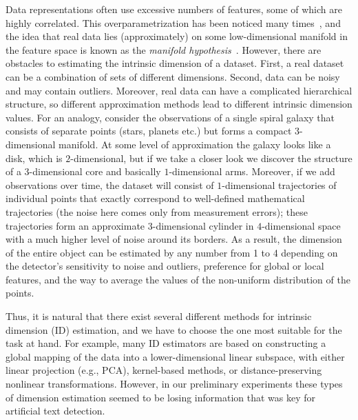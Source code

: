 \documentclass{article}
\begin{document}
Data representations often use excessive numbers of features, some of which are highly correlated. This overparametrization has been noticed many times~\citep{Hein-Audibert-2005, Kuleshov-et-al-2017, pope2021the}, and the idea that real data lies (approximately) on some low-dimensional manifold in the feature space is known as the \textit{manifold hypothesis}~\citep{Goodfellow-et-al-2016}.
However, there are obstacles to estimating the intrinsic dimension of a dataset. First, a real dataset can be a combination of sets of different dimensions.
Second, data can be noisy and may contain outliers. Moreover, real data can have a complicated hierarchical structure, so different approximation methods lead to different intrinsic dimension values. For an analogy, consider the observations of a single spiral galaxy that consists of separate points (stars, planets etc.) but forms a compact $3$-dimensional manifold. At some level of approximation the galaxy looks like a disk, which is $2$-dimensional, but if we take a closer look we discover the structure of a $3$-dimensional core and basically $1$-dimensional arms. Moreover, if we add observations over time, the dataset will consist of $1$-dimensional trajectories of individual points that exactly correspond to well-defined mathematical trajectories (the noise here comes only from measurement errors); these trajectories form an approximate $3$-dimensional cylinder in $4$-dimensional space with a much higher level of noise around its borders. As a result, the dimension of the entire object can be estimated by any number from 1 to 4 depending on the detector's sensitivity to noise and outliers, preference for global or local features, and the way to average the values of the non-uniform distribution of the points. 



Thus, it is natural that there exist several different methods for intrinsic dimension (ID) estimation, and we have to choose the one most suitable for the task at hand. For example, many ID estimators are based on constructing a global mapping of the data into a lower-dimensional linear subspace, with either linear projection (e.g., PCA), kernel-based methods, or distance-preserving nonlinear transformations. However, in our preliminary experiments these types of dimension estimation seemed to be losing information that was key for artificial text detection. 
\end{document}
